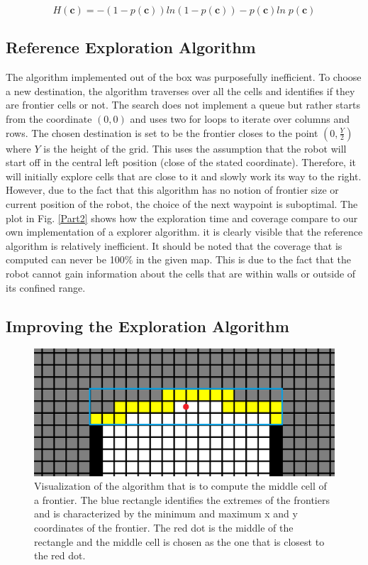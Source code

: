 \documentclass[a4paper,12pt]{article}
\begin{document}
					\begin{equation}
						H \left(\textbf{c}\right) = -\left(1-p\left(\textbf{c}\right)\right)ln\left(1-p\left(\textbf{c}\right)\right) - p\left(\textbf{c}\right)ln \; p\left(\textbf{c}\right)
						\label{eq:singleCellEntropy}
					\end{equation}

			\subsection{Reference Exploration Algorithm}

				The algorithm implemented out of the box was purposefully inefficient. To choose a new destination, the algorithm traverses over all the cells and identifies if they are frontier cells or not. The search does not implement a queue but rather starts from the coordinate $(0,0)$ and uses two for loops to iterate over columns and rows. The chosen destination is set to be the frontier closes to the point $(0,\frac{Y}{2})$ where $Y$ is the height of the grid. This uses the assumption that the robot will start off in the central left position (close of the stated coordinate). Therefore, it will initially explore cells that are close to it and slowly work its way to the right. However, due to the fact that this algorithm has no notion of frontier size or current position of the robot, the choice of the next waypoint is suboptimal. The plot in Fig. \ref{Part2} shows how the exploration time and coverage compare to our own implementation of a explorer algorithm. it is clearly visible that the reference algorithm is relatively inefficient. It should be noted that the coverage that is computed can never be 100\% in the given map. This is due to the fact that the robot cannot gain information about the cells that are within walls or outside of its confined range.  
			
			\subsection{Improving the Exploration Algorithm}

				\begin{figure}[H]
					\centering
					\includegraphics[scale=0.25]{images/middleCellVisualization.png}
					\caption{Visualization of the algorithm that is to compute the middle cell of a frontier. The blue rectangle identifies the extremes of the frontiers and is characterized by the minimum and maximum x and y coordinates of the frontier. The red dot is the middle of the rectangle and the middle cell is chosen as the one that is closest to the red dot.}
					\label{middleCellVisualization}
				\end{figure}
\end{document}
